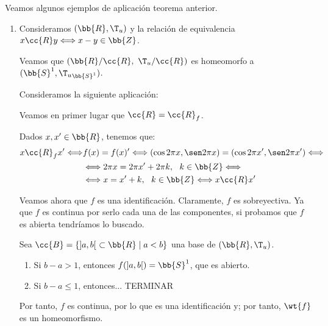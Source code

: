 \begin{ejemplo} Veamos algunos ejemplos de aplicación teorema anterior.
    \begin{enumerate}
        \item Consideramos $(\bb{R},\T_u)$ y la relación de equivalencia $x\cc{R}y\Longleftrightarrow x-y\in\bb{Z}$.

        Veamos que $(\bb{R}/\cc{R},~ \T_u/\cc{R})$ es homeomorfo a $(\bb{S}^1,{\T_{u}}_{\bb{S}^1})$.

        Consideramos la siguiente aplicación:

        Veamos en primer lugar que $\cc{R}=\cc{R}_f$.

        Dados $x,x'\in \bb{R}$, tenemos que:
        \begin{equation*}
            \begin{split}
                x\cc{R}_fx' \Longleftrightarrow &f(x)=f(x)' \Longleftrightarrow
                \left(\cos 2\pi x, \sen 2\pi x\right) = \left(\cos 2\pi x', \sen 2\pi x'\right) \Longleftrightarrow \\
                &\Longleftrightarrow 2\pi x = 2\pi x' + 2\pi k,~~k\in \bb{Z}
                \Longleftrightarrow \\
                &\Longleftrightarrow  x = x' + k,~~k\in \bb{Z} 
                \Longleftrightarrow x\cc{R}x'
            \end{split}
        \end{equation*}

        Veamos ahora que $f$ es una identificación. Claramente, $f$ es sobreyectiva. Ya que $f$ es continua por serlo cada una de las componentes, si probamos que $f$ es abierta tendríamos lo buscado.

        Sea $\cc{B} = \{]a,b[~\subset \bb{R}\mid a<b\}$ una base de $(\bb{R}, \T_u)$.
        \begin{enumerate}
            \item Si $b-a>1$, entonces $f(]a,b[) = \bb{S}^1$, que es abierto.

            \item Si $b-a\leq 1$, entonces... TERMINAR %
        \end{enumerate}
        Por tanto, $f$ es continua, por lo que es una identificación y; por tanto, $\wt{f}$ es un homeomorfismo.
    \end{enumerate}
\end{ejemplo}


